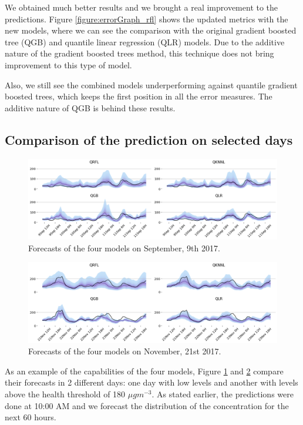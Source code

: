 \documentclass[a4paper,3p,sort&compress]{elsarticle}
\begin{document}
We obtained much better results and we brought a real improvement to
the predictions. Figure \ref{figure:errorGraph_rfl} shows the updated
metrics with the new models, where we can see the comparison with the
original gradient boosted tree (QGB) and quantile linear regression
(QLR) models. Due to the additive nature of the gradient boosted trees
method, this technique does not bring improvement to this type of
model.

Also, we still see the combined models underperforming against
quantile gradient boosted trees, which keeps the first position in all
the error measures. The additive nature of QGB is behind these
results. 

\subsection{Comparison of the prediction on selected days}

\begin{figure}
  \centering
  \includegraphics[width=1\textwidth]{evoday1}
  \caption{Forecasts of the four models on September, 9th
    2017.}
  \label{figure:evoday1} 
\end{figure}

\begin{figure}
  \centering
  \includegraphics[width=1\textwidth]{evoday2}
  \caption{Forecasts of the four models on November, 21st 2017.}
  \label{figure:evoday2} 
\end{figure}

As an example of the capabilities of the four models, Figure
\ref{figure:evoday1} and \ref{figure:evoday2} compare their forecasts
in 2 different days: one day with low \no levels and another with
levels above the health threshold of 180 $\mu gm^{-3}$.  As stated
earlier, the predictions were done at 10:00 AM and we forecast the
distribution of the concentration for the next 60 hours.
\end{document}

